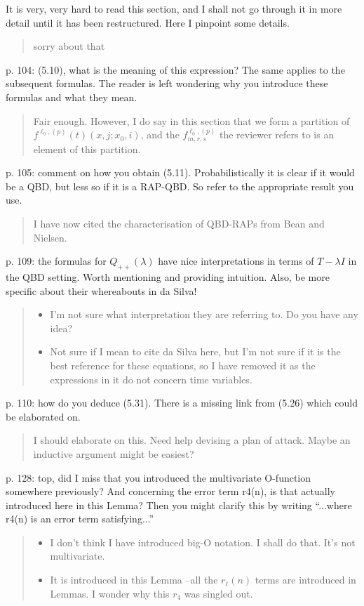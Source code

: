 \documentclass[a4paper]{article}
\begin{document}
It is very, very hard to read this section, and I shall not go through it in more detail until it has been restructured. Here I pinpoint some details.
\begin{quote}
    sorry about that 
\end{quote}

p. 104: (5.10), what is the meaning of this expression? The same applies to the subsequent formulas. The reader is left wondering why you introduce these formulas and what they mean.
\begin{quote}
    Fair enough. However, I do say in this section that we form a partition of \(f^{\ell_0,(p)}(t)(x,j;x_0,i)\), and the \(f_{m,r,s}^{\ell_0,(p)}\) the reviewer refers to is an element of this partition. 
\end{quote}

p. 105: comment on how you obtain (5.11). Probabilistically it is clear if it would be a QBD, but less so if it is a RAP-QBD. So refer to the appropriate result you use. 
\begin{quote}
    I have now cited the characterisation of QBD-RAPs from Bean and Nielsen.
\end{quote}

p. 109: the formulas for \(Q_{++}(\lambda)\) have nice interpretations in terms of \(T -\lambda I\) in the QBD setting. Worth mentioning and providing intuition. Also, be more specific about their whereabouts in da Silva!
\begin{quote}
    \begin{itemize}
        \item I'm not sure what interpretation they are referring to. Do you have any idea?
        \item Not sure if I mean to cite da Silva here, but I'm not sure if it is the best reference for these equations, so I have removed it as the expressions in it do not concern time variables.  
    \end{itemize}
\end{quote}

p. 110: how do you deduce (5.31). There is a missing link from (5.26) which could be elaborated on.
\begin{quote}
    I should elaborate on this. Need help devising a plan of attack. Maybe an inductive argument might be easiest? 
\end{quote}

p. 128: top, did I miss that you introduced the multivariate O-function somewhere previously? And concerning the error term r4(n), is that actually introduced here in this Lemma? Then you might clarify this by writing “...where r4(n) is an error term satisfying...”
\begin{quote}
    \begin{itemize}
        \item I don't think I have introduced big-O notation. I shall do that. It's not multivariate. 
        \item It is introduced in this Lemma --all the \(r_\ell(n)\) terms are introduced in Lemmas. I wonder why this \(r_4\) was singled out.
    \end{itemize}
\end{quote}
\end{document}

